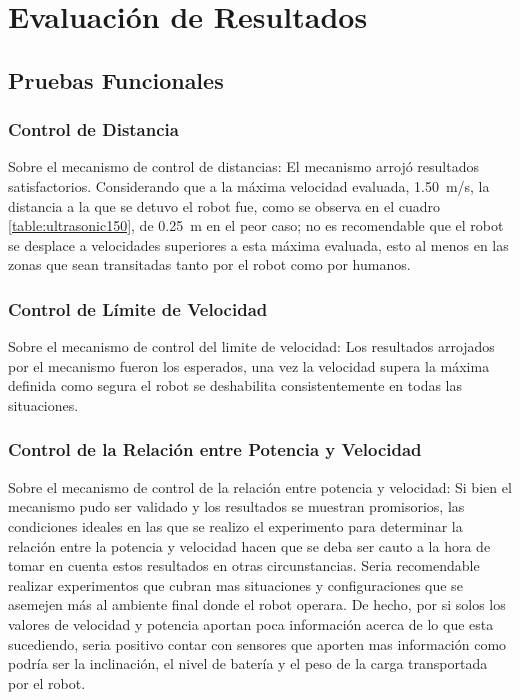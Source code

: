 \documentclass[withindex,glossary]{cam-thesis}
\begin{document}

\section{Evaluación de Resultados} \label{sec:Exp Eval :: Evaluación Resultados}
\subsection{Pruebas Funcionales}
\subsubsection{Control de Distancia}
Sobre el mecanismo de control de distancias: El mecanismo arrojó resultados satisfactorios. Considerando que a la máxima velocidad evaluada, \SI{1.50}{\metre/\second}, la distancia a la que se detuvo el robot fue, como se observa en el cuadro \ref{table:ultrasonic150}, de \SI{0.25}{\metre} en el peor caso; no es recomendable que el robot se desplace a velocidades superiores a esta máxima evaluada, esto al menos en las zonas que sean transitadas tanto por el robot como por humanos.
\subsubsection{Control de Límite de Velocidad}
Sobre el mecanismo de control del limite de velocidad: Los resultados arrojados por el mecanismo fueron los esperados, una vez la velocidad supera la máxima definida como segura el robot se deshabilita consistentemente en todas las situaciones.
\subsubsection{Control de la Relación entre Potencia y Velocidad}
Sobre el mecanismo de control de la relación entre potencia y velocidad: Si bien el mecanismo pudo ser validado y los resultados se muestran promisorios, las condiciones ideales en las que se realizo el experimento para determinar la relación entre la potencia y velocidad hacen que se deba ser cauto a la hora de tomar en cuenta estos resultados en otras circunstancias. Seria recomendable realizar experimentos que cubran mas situaciones y configuraciones que se asemejen más al ambiente final donde el robot operara. De hecho, por si solos los valores de velocidad y potencia aportan poca información acerca de lo que esta sucediendo, seria positivo contar con sensores que aporten mas información como podría ser la inclinación, el nivel de batería y el peso de la carga transportada por el robot.
\end{document}
